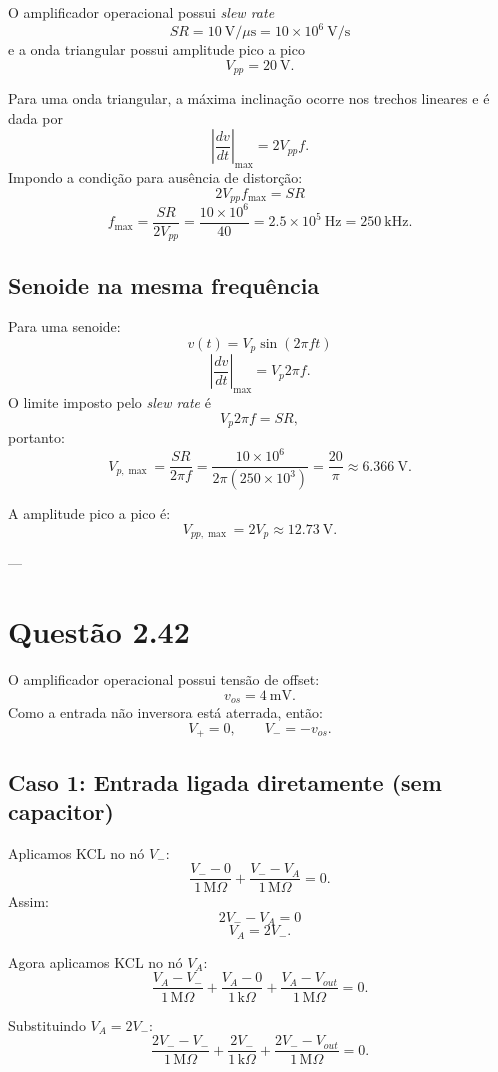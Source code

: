 O amplificador operacional possui \textit{slew rate}
\[
SR = 10\ \text{V}/\mu\text{s} = 10\times 10^{6}\ \text{V/s}
\]
e a onda triangular possui amplitude pico a pico
\[
V_{pp} = 20\ \text{V}.
\]

Para uma onda triangular, a máxima inclinação ocorre nos trechos lineares e é dada por
\[
\left|\frac{dv}{dt}\right|_{\max} = 2 V_{pp} f.
\]
Impondo a condição para ausência de distorção:
\[
2V_{pp} f_{\max} = SR
\]
\[
f_{\max} = \frac{SR}{2V_{pp}}
= \frac{10\times 10^{6}}{40}
= 2.5\times 10^{5}\ \text{Hz}
= 250\ \text{kHz}.
\]

\subsection*{Senoide na mesma frequência}

Para uma senoide:
\[
v(t)=V_p\sin(2\pi f t)
\]
\[
\left|\frac{dv}{dt}\right|_{\max}=V_p 2\pi f.
\]
O limite imposto pelo \textit{slew rate} é
\[
V_p 2\pi f = SR,
\]
portanto:
\[
V_{p,\max} = \frac{SR}{2\pi f}
= \frac{10\times 10^{6}}{2\pi (250\times10^{3})}
= \frac{20}{\pi}
\approx 6.366\ \text{V}.
\]

A amplitude pico a pico é:
\[
V_{pp,\max}=2V_p\approx 12.73\ \text{V}.
\]

---

\section*{Questão 2.42}

O amplificador operacional possui tensão de offset:
\[
v_{os}=4\ \text{mV}.
\]
Como a entrada não inversora está aterrada, então:
\[
V_+ = 0,\qquad V_- = -v_{os}.
\]

\subsection*{Caso 1: Entrada ligada diretamente (sem capacitor)}

Aplicamos KCL no nó $V_-$:
\[
\frac{V_- - 0}{1\,\text{M}\Omega}
+ \frac{V_- - V_A}{1\,\text{M}\Omega} = 0.
\]
Assim:
\[
2V_- - V_A = 0
\]
\[
V_A = 2V_-.
\]

Agora aplicamos KCL no nó $V_A$:
\[
\frac{V_A - V_-}{1\,\text{M}\Omega}
+ \frac{V_A - 0}{1\,\text{k}\Omega}
+ \frac{V_A - V_{out}}{1\,\text{M}\Omega}=0.
\]

Substituindo $V_A=2V_-$:
\[
\frac{2V_- - V_-}{1\,\text{M}\Omega}
+ \frac{2V_-}{1\,\text{k}\Omega}
+ \frac{2V_- - V_{out}}{1\,\text{M}\Omega}=0.
\]

